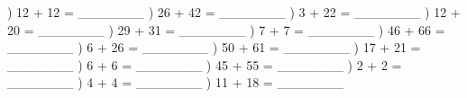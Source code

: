 \documentclass{article}%
\begin{document}
) 12 + 12 = \_\_\_\_\_\_\_%
\newline%
\newline%
) 26 + 42 = \_\_\_\_\_\_\_%
\newline%
\newline%
) 3 + 22 = \_\_\_\_\_\_\_%
\newline%
\newline%
) 12 + 20 = \_\_\_\_\_\_\_%
\newline%
\newline%
) 29 + 31 = \_\_\_\_\_\_\_%
\newline%
\newline%
) 7 + 7 = \_\_\_\_\_\_\_%
\newline%
\newline%
) 46 + 66 = \_\_\_\_\_\_\_%
\newline%
\newline%
) 6 + 26 = \_\_\_\_\_\_\_%
\newline%
\newline%
) 50 + 61 = \_\_\_\_\_\_\_%
\newline%
\newline%
) 17 + 21 = \_\_\_\_\_\_\_%
\newline%
\newline%
) 6 + 6 = \_\_\_\_\_\_\_%
\newline%
\newline%
) 45 + 55 = \_\_\_\_\_\_\_%
\newline%
\newline%
) 2 + 2 = \_\_\_\_\_\_\_%
\newline%
\newline%
) 4 + 4 = \_\_\_\_\_\_\_%
\newline%
\newline%
) 11 + 18 = \_\_\_\_\_\_\_%
\newline%
\end{document}
